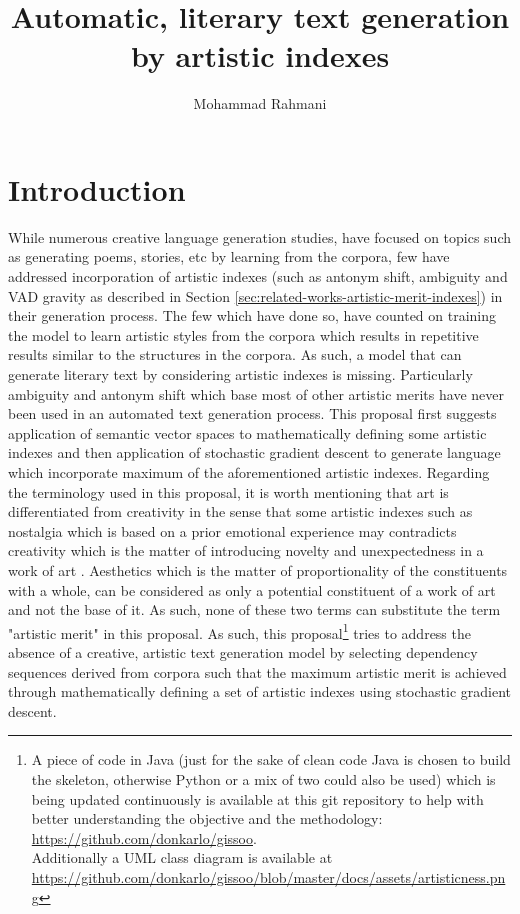\documentclass{article}
\begin{document}
	
	\title{Automatic, literary text generation by artistic indexes}
	\author{Mohammad Rahmani}
	\date{}
	\maketitle
	\section{Introduction} \label{sec:introduction}
	While numerous creative language generation studies, have focused on topics such as generating poems, stories, etc by learning from the corpora, few have addressed incorporation of artistic indexes (such as antonym shift, ambiguity and VAD gravity as  described in Section \ref{sec:related-works-artistic-merit-indexes}) in their generation process. The few which have done so, have counted on training the model to learn artistic styles from the corpora which results in repetitive results similar to the structures in the corpora. As such, a model that can generate literary text by considering artistic indexes is missing. Particularly ambiguity and antonym shift which base most of other artistic merits have never been used in an automated text generation process. This proposal first suggests application of semantic vector spaces to mathematically defining some artistic indexes and then application of stochastic gradient descent to generate language which incorporate maximum of the aforementioned artistic indexes. Regarding the terminology used in this proposal, it is worth mentioning that art is differentiated from creativity in the sense that some artistic indexes such as nostalgia which is based on a prior emotional experience may contradicts creativity which is the matter of introducing novelty and unexpectedness in a work of art \citep{jordanous-2012-a-standardised-procedure-for-evaluating-creative-systems-computational-creativity-evaluation-based-on-what-it-is-to-be-creative}. Aesthetics which is the matter of proportionality of the constituents with a whole, can be considered as only a potential constituent of a work of art and not the base of it. As such, none of these two terms can substitute the term "artistic merit" in this proposal.  As such, this proposal\footnote{A piece of code in Java (just for the sake of clean code Java is chosen to build the skeleton, otherwise Python or a mix of two could also be used) which is being updated continuously is available at this  git repository to help with better understanding the objective and the methodology: \\ \url{https://github.com/donkarlo/gissoo}. \\Additionally a UML class diagram is available at\\ \url{https://github.com/donkarlo/gissoo/blob/master/docs/assets/artisticness.png}} tries to address the absence of a creative, artistic text generation model by selecting dependency sequences derived from corpora such that the maximum artistic merit is achieved through mathematically defining a set of artistic indexes using stochastic gradient descent.      
	
\end{document}
